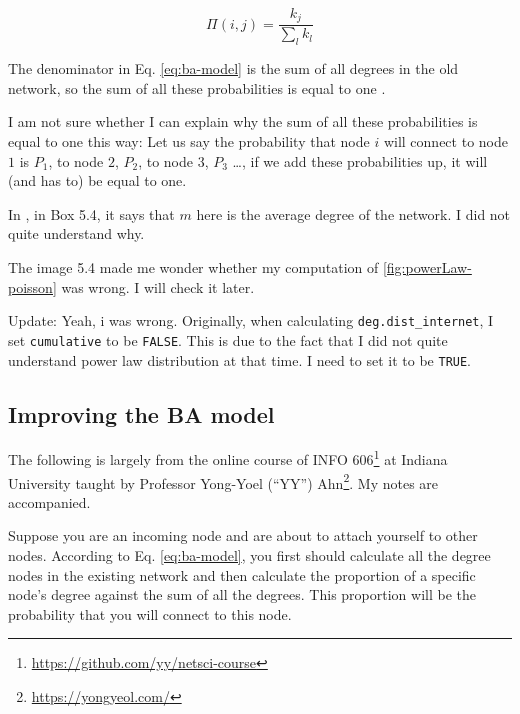 \documentclass[
]{krantz}
\makeatletter
\renewcommand{\href}[2]{#2\footnote{\url{#1}}}
\newenvironment{kframe}{%
\medskip{}
\setlength{\fboxsep}{.8em}
 \def\at@end@of@kframe{}%
 \ifinner\ifhmode%
  \def\at@end@of@kframe{\end{minipage}}%
  \begin{minipage}{\columnwidth}%
 \fi\fi%
 \def\FrameCommand##1{\hskip\@totalleftmargin \hskip-\fboxsep
 \colorbox{shadecolor}{##1}\hskip-\fboxsep
     \hskip-\linewidth \hskip-\@totalleftmargin \hskip\columnwidth}%
 \MakeFramed {\advance\hsize-\width
   \@totalleftmargin\z@ \linewidth\hsize
   \@setminipage}}%
 {\par\unskip\endMakeFramed%
 \at@end@of@kframe}
\newenvironment{rmdblock}[1]
  {
  \begin{itemize}
  \renewcommand{\labelitemi}{
    \raisebox{-.7\height}[0pt][0pt]{
      {\setkeys{Gin}{width=3em,keepaspectratio}\texttt{[image: images/\#1]}}
    }
  }
  \setlength{\fboxsep}{1em}
  \begin{kframe}
  \item
  }
  {
  \end{kframe}
  \end{itemize}
  }
\newenvironment{rmdnote}
  {\begin{rmdblock}{note}}
  {\end{rmdblock}}
\newenvironment{rmdtip}
  {\begin{rmdblock}{tip}}
  {\end{rmdblock}}
\newenvironment{rmdreminder}
  {\begin{rmdblock}{reminder}}
  {\end{rmdblock}}
\makeatother
\begin{document}
\begin{equation}
  \Pi(i, j) = \frac{k_j}{\sum\limits_l k_l} \label{eq:ba-model}
\end{equation}

The denominator in Eq. \eqref{eq:ba-model} is the sum of all degrees in the old network, so the sum of all these probabilities is equal to one \citep{menczer2020first}.

\begin{rmdtip}
I am not sure whether I can explain why the sum of all these probabilities is equal to one this way: Let us say the probability that node \(i\) will connect to node \(1\) is \(P_1\), to node \(2\), \(P_2\), to node \(3\), \(P_3\) \ldots, if we add these probabilities up, it will (and has to) be equal to one.
\end{rmdtip}

\begin{rmdreminder}
In \citet{menczer2020first}, in Box 5.4, it says that \(m\) here is the average degree of the network. I did not quite understand why.
\end{rmdreminder}

\begin{rmdreminder}
The image 5.4 made me wonder whether my computation of \ref{fig:powerLaw-poisson} was wrong. I will check it later.

Update: Yeah, i was wrong. Originally, when calculating \texttt{deg.dist\_internet}, I set \texttt{cumulative} to be \texttt{FALSE}. This is due to the fact that I did not quite understand power law distribution at that time. I need to set it to be \texttt{TRUE}.
\end{rmdreminder}

\hypertarget{improving-the-ba-model}{%
\subsection{Improving the BA model}\label{improving-the-ba-model}}

\begin{rmdnote}
The following is largely from the online course of \href{https://github.com/yy/netsci-course}{INFO 606} at Indiana University taught by Professor \href{https://yongyeol.com/}{Yong-Yoel (``YY'') Ahn}. My notes are accompanied.
\end{rmdnote}

Suppose you are an incoming node and are about to attach yourself to other nodes. According to Eq. \eqref{eq:ba-model}, you first should calculate all the degree nodes in the existing network and then calculate the proportion of a specific node's degree against the sum of all the degrees. This proportion will be the probability that you will connect to this node.
\end{document}
